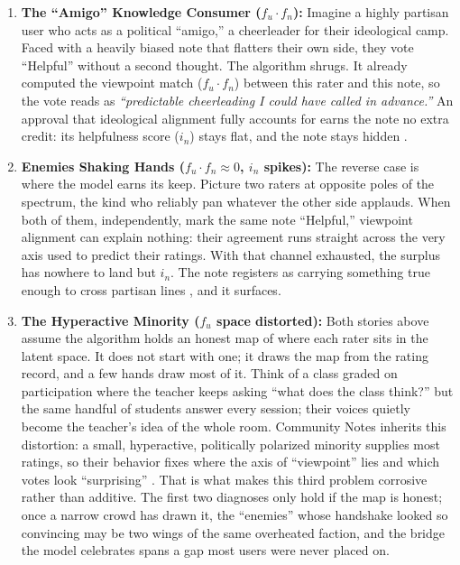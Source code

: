 \documentclass[10pt,twocolumn]{article}
\begin{document}
\begin{enumerate}
    \item \textbf{The ``Amigo'' Knowledge Consumer ($f_u \cdot f_n$):}
    Imagine a highly partisan user who acts as a political ``amigo,'' a cheerleader for their ideological camp. Faced with a heavily biased note that flatters their own side, they vote ``Helpful'' without a second thought. The algorithm shrugs. It already computed the viewpoint match ($f_u \cdot f_n$) between this rater and this note, so the vote reads as \textit{``predictable cheerleading I could have called in advance.''} An approval that ideological alignment fully accounts for earns the note no extra credit: its helpfulness score ($i_n$) stays flat, and the note stays hidden \cite{wojcik2022birdwatch}.

    \item \textbf{Enemies Shaking Hands ($f_u \cdot f_n \approx 0$, $i_n$ spikes):}
    The reverse case is where the model earns its keep. Picture two raters at opposite poles of the spectrum, the kind who reliably pan whatever the other side applauds. When both of them, independently, mark the same note ``Helpful,'' viewpoint alignment can explain nothing: their agreement runs straight across the very axis used to predict their ratings. With that channel exhausted, the surplus has nowhere to land but $i_n$. The note registers as carrying something true enough to cross partisan lines \cite{buterin2023what}, and it surfaces.

    \item \textbf{The Hyperactive Minority ($f_u$ space distorted):}
    Both stories above assume the algorithm holds an honest map of where each rater sits in the latent space. It does not start with one; it draws the map from the rating record, and a few hands draw most of it. Think of a class graded on participation where the teacher keeps asking ``what does the class think?'' but the same handful of students answer every session; their voices quietly become the teacher's idea of the whole room. Community Notes inherits this distortion: a small, hyperactive, politically polarized minority supplies most ratings, so their behavior fixes where the axis of ``viewpoint'' lies and which votes look ``surprising'' \cite{nudo2026hyperactive}. That is what makes this third problem corrosive rather than additive. The first two diagnoses only hold if the map is honest; once a narrow crowd has drawn it, the ``enemies'' whose handshake looked so convincing may be two wings of the same overheated faction, and the bridge the model celebrates spans a gap most users were never placed on.
\end{enumerate}
\end{document}
